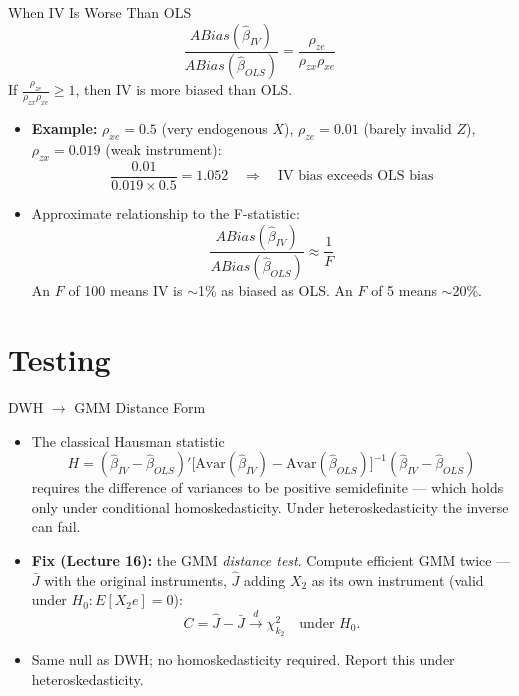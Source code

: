 \documentclass[aspectratio=169, handout]{beamer}
\numberwithin{equation}{section}
\begin{document}
\begin{frame}{When IV Is Worse Than OLS}
$$\frac{ABias(\hat{\beta}_{IV})}{ABias(\hat{\beta}_{OLS})}=\frac{\rho_{ze}}{\rho_{zx}\rho_{xe}}$$
If $\frac{\rho_{ze}}{\rho_{zx}\rho_{xe}}\geq 1$, then \alert{IV is more biased than OLS}.
\vspace{0.2cm}
\begin{itemize}
\item \textbf{Example:} $\rho_{xe}=0.5$ (very endogenous $X$), $\rho_{ze}=0.01$ (barely invalid $Z$), $\rho_{zx}=0.019$ (weak instrument):
$$\frac{0.01}{0.019\times 0.5}=1.052 \quad\Rightarrow\quad \text{IV bias exceeds OLS bias}$$
\item Approximate relationship to the F-statistic:
$$\frac{ABias(\hat{\beta}_{IV})}{ABias(\hat{\beta}_{OLS})}\approx \frac{1}{F}$$
An $F$ of 100 means IV is $\sim$1\% as biased as OLS.  An $F$ of 5 means $\sim$20\%.
\end{itemize}
\end{frame}


\section{Testing}

\begin{frame}{DWH $\to$ GMM Distance Form}
\begin{itemize}
\item The classical Hausman statistic
$$H=(\hat{\beta}_{IV}-\hat{\beta}_{OLS})'\bigl[\text{Avar}(\hat{\beta}_{IV})-\text{Avar}(\hat{\beta}_{OLS})\bigr]^{-1}(\hat{\beta}_{IV}-\hat{\beta}_{OLS})$$
requires the difference of variances to be positive semidefinite --- which holds \alert{only under conditional homoskedasticity}.  Under heteroskedasticity the inverse can fail.
\item \textbf{Fix (Lecture 16):} the GMM \emph{distance test}.  Compute efficient GMM twice --- $\bar{J}$ with the original instruments, $\hat{J}$ adding $X_2$ as its own instrument (valid under $H_0:E[X_2 e]=0$):
$$C=\hat{J}-\bar{J}\xrightarrow{d}\chi^2_{k_2} \quad \text{under } H_0.$$
\item Same null as DWH; no homoskedasticity required.  Report this under heteroskedasticity.
\end{itemize}
\end{frame}
\end{document}
